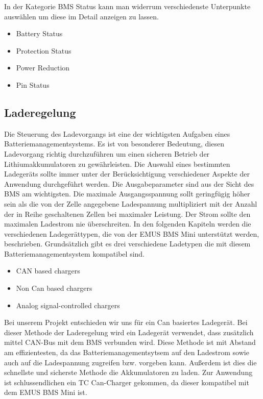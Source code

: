 In der Kategorie BMS Status kann man widerrum verschiedenste Unterpunkte auswählen um diese im Detail anzeigen zu lassen.

\begin{itemize}
\item{Battery Status}\\
\item{Protection Status}\\
\item{Power Reduction}\\
\item{Pin Status}\\
\end{itemize}
\newpage

\subsection{Laderegelung}
Die Steuerung des Ladevorgangs ist eine der wichtigsten Aufgaben eines Batteriemanagementsystems. Es ist von besonderer Bedeutung, diesen Ladevorgang richtig durchzuführen um einen sicheren Betrieb der Lithiumakkumulatoren zu gewährleisten. Die Auswahl eines bestimmten Ladegeräts sollte immer unter der Berücksichtigung verschiedener Aspekte der Anwendung durchgeführt werden. Die Ausgabeparameter sind aus der Sicht des BMS am wichtigsten. Die maximale Ausgangsspannung sollt geringfügig höher sein als die von der Zelle angegebene Ladespannung multipliziert mit der Anzahl der in Reihe geschaltenen Zellen bei maximaler Leistung. Der Strom sollte den maximalen Ladestrom nie überschreiten. In den folgenden Kapiteln werden die verschiedenen Ladegerättypen, die von der EMUS BMS Mini unterstützt werden, beschrieben.
Grundsätzlich gibt es drei verschiedene Ladetypen die mit diesem Batteriemanagementsystem kompatibel sind.

\begin{itemize}
\item{CAN based chargers}\\
\item{Non Can based chargers}\\
\item{Analog signal-controlled chargers}\\
\end{itemize}

Bei unserem Projekt entschieden wir uns für ein Can basiertes Ladegerät. Bei dieser Methode der Laderegelung wird ein Ladegerät verwendet, dass zusätzlich mittel CAN-Bus mit dem BMS verbunden wird. Diese Methode ist mit Abstand am effizientesten, da das Batteriemanagementsytsem auf den Ladestrom sowie auch auf die Ladespannung zugreifen bzw. vorgeben kann. Außerdem ist dies die schnellste und sicherste Methode die Akkumulatoren zu laden. Zur Anwendung ist schlussendlichen ein TC Can-Charger gekommen, da dieser kompatibel mit dem EMUS BMS Mini ist.
\newpage


